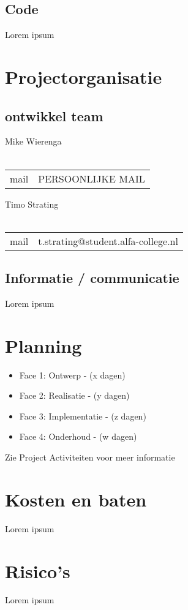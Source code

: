 \documentclass[]{report}
\begin{document}
\section{Code}		
Lorem ipsum




\chapter{Projectorganisatie}

\section{ontwikkel team}
Mike Wierenga \\ \\
\begin{tabular}{ l c }
	mail & PERSOONLIJKE MAIL  \\
\end{tabular}

\vspace*{25px}

Timo Strating \\ \\
\begin{tabular}{ l c }
	mail & t.strating@student.alfa-college.nl  \\
\end{tabular}

\vspace*{25px}


\section{Informatie / communicatie}

Lorem ipsum



\chapter{Planning}

\begin{itemize}
	\item Face 1: Ontwerp - (x dagen)	
	\item Face 2: Realisatie - (y dagen)	
	\item Face 3: Implementatie  - (z dagen)	
	\item Face 4: Onderhoud  - (w dagen)
		\newline
\end{itemize} 

Zie Project Activiteiten voor meer informatie




\chapter{Kosten en baten}

Lorem ipsum



\chapter{Risico’s}

Lorem ipsum
\end{document}
